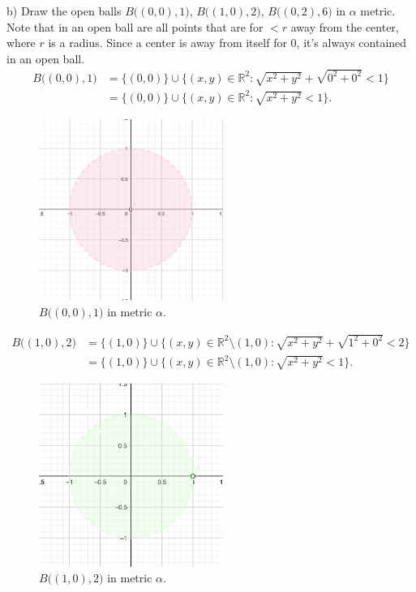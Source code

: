 \documentclass[a4paper,11pt]{article}
\begin{document}
\noindent
b) Draw the open balls $B \big((0, 0), 1 \big)$, $B \big((1, 0), 2 \big)$, $B \big((0, 2), 6 \big)$ in $\alpha$ metric. 
\\
Note that in an open ball are all points that are for $< r$ away from the center, where $r$ is a radius. Since a center is away from itself for $0$, it's always contained in an open ball.
\begin{align*} 
    B \big((0, 0), 1 \big) &= \{(0,0)\} \cup \{(x,y) \in \mathbb{R}^2 : \sqrt{x^2 + y^2} + \sqrt{0^2 + 0^2}< 1 \} 
    \\
    &= \{(0,0)\} \cup \{(x,y) \in \mathbb{R}^2 : \sqrt{x^2 + y^2} < 1 \}. 
\end{align*}

\begin{figure}[ht!]
    \centering
    \includegraphics[width=60mm]{b1.png}
    \caption{$B \big((0, 0), 1 \big)$ in metric $\alpha$.}
\end{figure}


\begin{align*} 
    B \big((1, 0), 2 \big) &= \{(1,0)\} \cup \{(x,y) \in \mathbb{R}^2 \setminus (1,0) : \sqrt{x^2 + y^2} + \sqrt{1^2 + 0^2} < 2 \}
    \\
    &= \{(1,0)\} \cup \{(x,y) \in \mathbb{R}^2 \setminus (1,0) : \sqrt{x^2 + y^2} < 1 \} .
\end{align*}

\begin{figure}[ht!]
    \centering
    \includegraphics[width=60mm]{b2.png}
    \caption{$B \big((1, 0), 2 \big)$ in metric $\alpha$.}
\end{figure}
\end{document}
